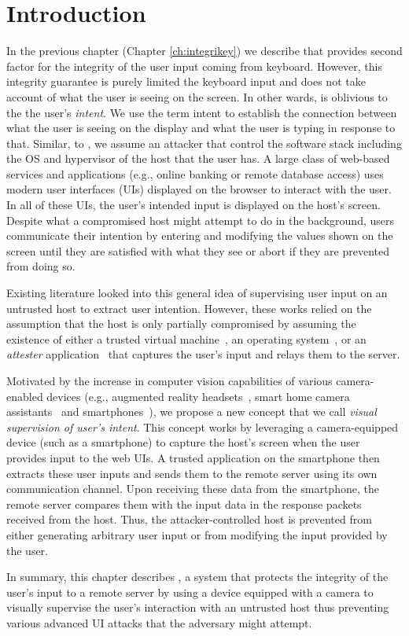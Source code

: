 \section{Introduction}
\label{integriscreen:sec:intro}

In the previous chapter (Chapter \ref{ch:integrikey}) we describe \integrikey that provides second factor for the integrity of the user input coming from keyboard. However, this integrity guarantee is purely limited the keyboard input and does not take account of what the user is seeing on the screen. In other wards, \integrikey is oblivious to the the user's \emph{intent}. We use the term intent to establish the connection between what the user is seeing on the display and what the user is typing in response to that. Similar, to \integrikey, we assume an attacker that control the software stack including the OS and hypervisor of the host that the user has. A large class of web-based services and applications (e.g., online banking or remote database access) uses modern user interfaces (UIs) displayed on the browser to interact with the user. In all of these UIs, the user's intended input is displayed on the host's screen. Despite what a compromised host might attempt to do in the background, users communicate their intention by entering and modifying the values shown on the screen until they are satisfied with what they see or abort if they are prevented from doing so.

Existing literature looked into this general idea of supervising user input on an untrusted host to extract user intention. However, these works relied on the assumption that the host is only partially compromised by assuming the existence of either a trusted virtual machine~\cite{gyrus}, an operating system~\cite{binder}, or an \emph{attester} application~\cite{nab} that captures the user's input and relays them to the server. 

 Motivated by the increase in computer vision capabilities of various camera-enabled devices (e.g., augmented reality headsets~\cite{TimCookAR, HoloLens2}, smart home camera assistants~\cite{fleck2008smart, lenovoSmartHome} and smartphones~\cite{wald2018real, smartphonesCV}), we propose a new concept that we call \emph{visual supervision of user's intent}. This concept works by leveraging a camera-equipped device (such as a smartphone) to capture the host's screen when the user provides input to the web UIs. A trusted application on the smartphone then extracts these user inputs and sends them to the remote server using its own communication channel. Upon receiving these data from the smartphone, the remote server compares them with the input data in the response packets received from the host. Thus, the attacker-controlled host is prevented from either generating arbitrary user input or from modifying the input provided by the user.


In summary, this chapter describes \sysname, a system that protects the integrity of the user's input to a remote server by using a device equipped with a camera to visually supervise the user's interaction with an untrusted host thus preventing various advanced UI attacks that the adversary might attempt.
